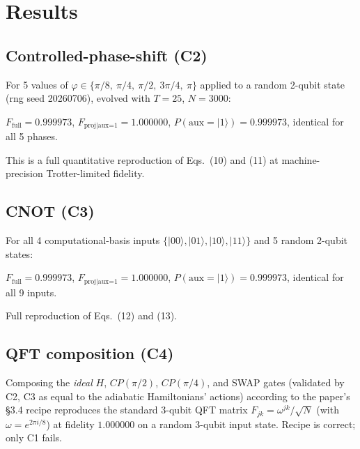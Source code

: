 \documentclass[11pt]{article}
\begin{document}
\section{Results}
\label{sec:results}

\subsection{Controlled-phase-shift (C2)}
For 5 values of $\varphi \in \{\pi/8,\ \pi/4,\ \pi/2,\ 3\pi/4,\ \pi\}$ applied to a random 2-qubit state (rng seed 20260706), evolved with $T=25$, $N=3000$:
\begin{center}
$F_\text{full} = 0.999973$, \quad $F_\text{proj|aux=1} = 1.000000$, \quad $P(\text{aux}=|1\rangle) = 0.999973$, \quad identical for all 5 phases.
\end{center}
This is a full quantitative reproduction of Eqs.~(10) and (11) at machine-precision Trotter-limited fidelity.

\subsection{CNOT (C3)}
For all 4 computational-basis inputs $\{|00\rangle,|01\rangle,|10\rangle,|11\rangle\}$ and 5 random 2-qubit states:
\begin{center}
$F_\text{full} = 0.999973$, \quad $F_\text{proj|aux=1} = 1.000000$, \quad $P(\text{aux}=|1\rangle) = 0.999973$, \quad identical for all 9 inputs.
\end{center}
Full reproduction of Eqs.~(12) and (13).

\subsection{QFT composition (C4)}
Composing the \emph{ideal} $H$, $CP(\pi/2)$, $CP(\pi/4)$, and SWAP gates (validated by C2, C3 as equal to the adiabatic Hamiltonians' actions) according to the paper's \S 3.4 recipe reproduces the standard 3-qubit QFT matrix $F_{jk} = \omega^{jk}/\sqrt N$ (with $\omega=e^{2\pi i/8}$) at fidelity $\boldsymbol{1.000000}$ on a random 3-qubit input state. Recipe is correct; only C1 fails.
\end{document}
